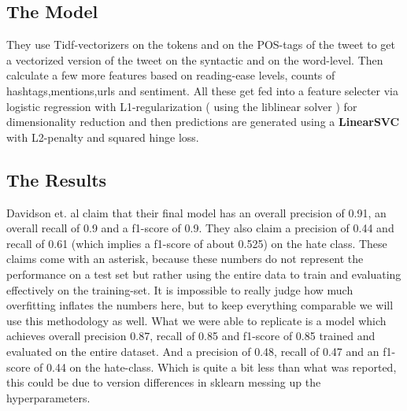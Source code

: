 \documentclass[11pt,a4paper]{article}
\begin{document}
\subsection{The Model}
They use Tidf-vectorizers on the tokens and on the POS-tags of the tweet to get a vectorized 
version of the tweet on the syntactic and on the word-level.
Then calculate a few more features based on reading-ease levels, counts of hashtags,mentions,urls and sentiment.
All these get fed into a feature selecter via logistic regression with L1-regularization ( using the liblinear solver )
for dimensionality reduction and then predictions are generated using a \textbf{LinearSVC} with L2-penalty and squared hinge loss.

\subsection{The Results}
Davidson et. al claim that their final model has an overall precision of 0.91, an overall recall of 0.9 and a f1-score of 0.9.
They also claim a precision of 0.44 and recall of 0.61 (which implies a f1-score of about 0.525) on the hate class.
These claims come with an asterisk, because these numbers do not represent the performance on a test set but rather using the entire
data to train and evaluating effectively on the training-set. 
It is impossible to really judge how much overfitting inflates the numbers here, but to keep everything comparable we will use this methodology as well.
What we were able to replicate is a model which achieves overall precision 0.87, recall of 0.85 and f1-score of 0.85 
trained and evaluated on the entire dataset.
And a precision of 0.48, recall of 0.47 and an f1-score of 0.44 on the hate-class.
Which is quite a bit less than what was reported, this could be due to version differences in sklearn messing up the hyperparameters.

\begin{table}
\caption{classification report for our reproduction of Davidson's model with features}


\label{tab:davidson_withfeat}
\end{table}
\end{document}
